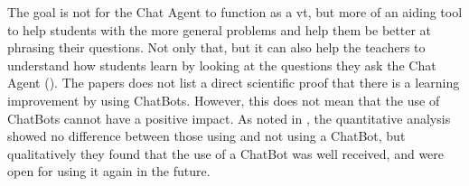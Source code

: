 \vspace{0.5em}\newline
The goal is not for the Chat Agent to function as a \gls{vt}, but more of an aiding tool to help students with the more general problems and help them be better at phrasing 
their questions. Not only that, but it can also help the teachers to understand how students learn by looking at the questions they ask the Chat Agent (\citet{Knill2004,Rossi2011}). 
The papers does not list a direct scientific proof that there is a learning improvement by using ChatBots. However, this does not mean that the use of ChatBots cannot have a 
positive impact. As noted in \citet{Kowalski2013}, the quantitative analysis showed no difference between those using and not using a ChatBot, but qualitatively they found that 
the use of a ChatBot was well received, and were open for using it again in the future.


